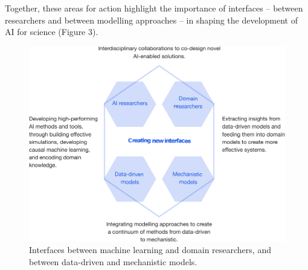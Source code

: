 Together, these areas for action highlight the importance of interfaces
-- between researchers and between modelling approaches -- in shaping
the development of AI for science (Figure 3).

\begin{figure}
\begin{center}
\includegraphics[width=\textwidth]{media/figure-3.pdf}
\caption{Interfaces between machine learning and domain researchers, and between data-driven and mechanistic models.}
\end{center}
\end{figure}
